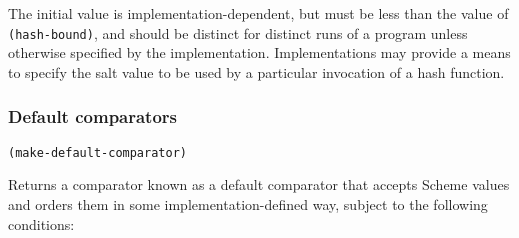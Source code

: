 The initial value is implementation-dependent, but must be less than the
value of \texttt{(hash-bound)}, and should be distinct for distinct runs
of a program unless otherwise specified by the implementation.
Implementations may provide a means to specify the salt value to be used
by a particular invocation of a hash function.

\hypertarget{Defaultcomparators}{\subsubsection{Default
comparators}\label{Defaultcomparators}}

\texttt{(make-default-comparator)}

Returns a comparator known as a default comparator that accepts Scheme
values and orders them in some implementation-defined way, subject to
the following conditions:

